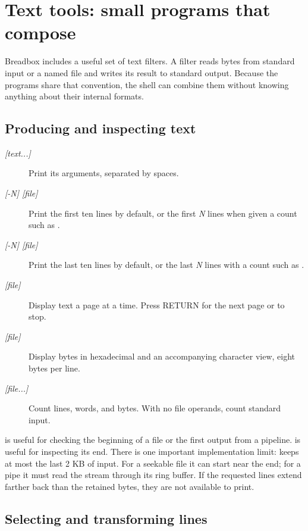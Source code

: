 \section{Text tools: small programs that compose}

Breadbox includes a useful set of text filters. A filter reads bytes from standard input or a named file and writes its result to standard output. Because the programs share that convention, the shell can combine them without knowing anything about their internal formats.

\subsection{Producing and inspecting text}

\begin{description}
  \item[ \textit{[text...]}] Print its arguments, separated by spaces.
  \item[ \textit{[-N] [file]}] Print the first ten lines by default, or the first \textit{N} lines when given a count such as .
  \item[ \textit{[-N] [file]}] Print the last ten lines by default, or the last \textit{N} lines with a count such as .
  \item[ \textit{[file]}] Display text a page at a time. Press RETURN for the next page or  to stop.
  \item[ \textit{[file]}] Display bytes in hexadecimal and an accompanying character view, eight bytes per line.
  \item[ \textit{[file...]}] Count lines, words, and bytes. With no file operands, count standard input.
\end{description}

 is useful for checking the beginning of a file or the first output from a pipeline.  is useful for inspecting its end. There is one important implementation limit:  keeps at most the last 2 KB of input. For a seekable file it can start near the end; for a pipe it must read the stream through its ring buffer. If the requested lines extend farther back than the retained bytes, they are not available to print.

\subsection{Selecting and transforming lines}

